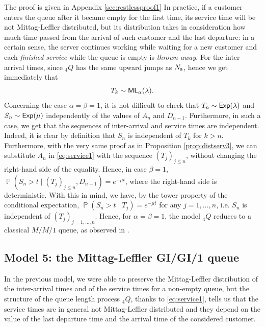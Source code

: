 \documentclass[]{amsart}
\numberwithin{equation}{section}
\theoremstyle{remark}
\theoremstyle{definition}
\DeclareMathOperator{\bP}{\mathbb{P}}
\begin{document}
{The proof is given in Appendix \ref{sec:restlessproof1}}
In practice, if a customer enters the queue after it became empty for the first time, its service time will be not Mittag-Leffler distributed, but its distribution takes in consideration how much time passed from the arrival of such customer and the last departure: in a certain sense, the server continues working while waiting for a new customer and each \textit{finished service} while the queue is empty is \textit{thrown away}. For the inter-arrival times, since ${}_4Q$ has the same upward jumps as $N_{\sf a}$, hence we get immediately that
\begin{equation*}
	T_k \sim {\sf ML}_\alpha(\lambda).
\end{equation*}
Concerning the case $\alpha=\beta=1$, it is not difficult to check that $T_n \sim {\sf Exp}(\lambda)$ and $S_n \sim {\sf Exp}(\mu)$ independently of the values of $A_n$ and $D_{n-1}$. Furthermore, in such a case, we get that the sequences of inter-arrival and service times are independent. Indeed, it is clear by definition that $S_n$ is independent of $T_k$ for $k > n$. Furthermore, with the very same proof as in Proposition \ref{prop:distserv3}, we can substitute $A_n$ in \eqref{eq:service1} with the sequence $(T_j)_{j \le n}$, without changing the right-hand side of the equality. Hence, in case $\beta=1$, $\bP(S_n>t \mid (T_j)_{j \le n}, D_{n-1})=e^{-\mu t}$, where the right-hand side is deterministic. With this in mind, we have, by the tower property of the conditional expectation, $\bP(S_n>t \mid T_j)=e^{-\mu t}$ for any $j=1,\dots,n$, i.e. $S_n$ is independent of $(T_j)_{j=1,\dots,n}$. Hence, for $\alpha=\beta=1$, the model ${}_4Q$ reduces to a classical $M/M/1$ queue, as observed in \cite{butt2023queuing}.
\subsection{Model 5: the Mittag-Leffler GI/GI/1 queue}\label{sec:Mod5}
In the previous model, we were able to preserve the Mittag-Leffler distribution of the inter-arrival times and of the service times for a non-empty queue, but the structure of the queue length process ${}_4Q$, thanks to \eqref{eq:service1}, tells us that the service times are in general not Mittag-Leffler distributed and they depend on the value of the last departure time and the arrival time of the considered customer.
\end{document}
